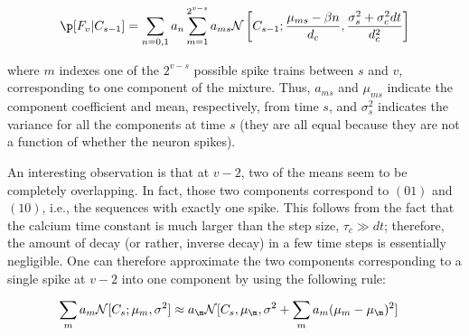 \begin{align}
\p[F_v | C_{s-1}] = \sum_{n=0,1} a_n
\sum_{m=1}^{2^{v-s}} a_{ms} \mathcal{N}\left[C_{s-1}; \frac{\mu_{ms} - \beta n}{d_c}, \frac{\sigma_s^2 + \sigma_c^2 dt}{d_c^2}\right] %
\end{align}

\noindent where $m$ indexes one of the $2^{v-s}$ possible spike trains between $s$ and $v$, corresponding to one component of the mixture.  Thus, $a_{ms}$ and $\mu_{ms}$ indicate the component coefficient and mean, respectively, from time $s$, and $\sigma_s^2$ indicates the variance for all the components at time $s$ (they are all equal because they are not a function of whether the neuron spikes).

An interesting observation is that at $v-2$, two of the means seem to be completely overlapping.  In fact, those two components correspond to $(01)$ and $(10)$, i.e., the sequences with exactly one spike.  This follows from the fact that the calcium time constant is much larger than the step size, $\tau_c \gg dt$; therefore, the amount of decay (or rather, inverse decay) in a few time steps is essentially negligible.  One can therefore approximate the two components corresponding to a single spike at $v-2$ into one component by using the following rule:

\begin{align} \label{eq:mix_approx1}
\sum_m a_{m} \mathcal{N}[C_s; \mu_{m}, \sigma^2] &\approx a_{\m} \mathcal{N}[C_s, \mu_{\m}, \sigma^2 + \sum_m a_{m} (\mu_{m}-\mu_{\m})^2]
\end{align}

